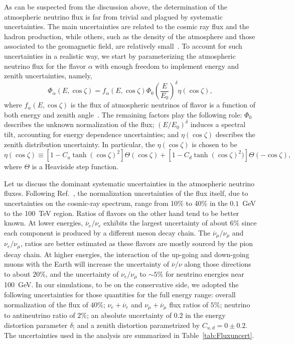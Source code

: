 As can be suspected from the discussion above, the determination of the atmospheric neutrino flux is far from trivial and plagued by systematic uncertainties.
The main uncertainties are related to the cosmic ray flux and the hadron production, while others, such as the density of the atmosphere and those associated to the geomagnetic field, are relatively small~\cite{Barr:2006it}. 
To account for such uncertainties in a realistic way, we start by parameterizing the
atmospheric neutrino flux for the flavor $\alpha$ with enough freedom to implement energy and zenith uncertainties, namely,
%
\begin{equation}
  \Phi_{\alpha}(E,\cos\zeta) =  f_{\alpha}(E,\cos\zeta)\Phi_{0}\left(\frac{E}{E_{0}}\right)^{\delta} \eta(\cos\zeta),
\end{equation}
%
where $f_{\alpha}(E,\cos\zeta)$ is the flux of atmospheric neutrinos of flavor is a function of both energy and zenith angle~\cite{Honda:2015fha}.
The remaining factors play the following role:
$\Phi_{0}$ describes the unknown  normalization of the flux; $(E/E_{0})^{\delta}$ induces a spectral tilt, accounting for energy dependence uncertainties; and $\eta(\cos\zeta)$ describes the zenith distribution uncertainty.
In particular, the $\eta(\cos\zeta)$ is chosen to be
\begin{equation}\label{eq:zenith_uncertainty}
  \eta(\cos\zeta) \equiv \left[1 - C_{u}\tanh(\cos\zeta)^{2}\right]\Theta(\cos\zeta)
  				+\left[1 - C_{d}\tanh(\cos\zeta)^{2})\right]\Theta(-\cos\zeta),
\end{equation}
where $\Theta$ is a Heaviside step function.


Let us discuss the dominant systematic uncertainties in the atmospheric neutrino fluxes. 
Following Ref.~\cite{Barr:2006it}, 
the normalization uncertainties of the flux itself, due to uncertainties on the cosmic-ray spectrum, range from 10\% to 40\% in the $0.1$~GeV to the 100~TeV region.
Ratios of flavors on the other hand tend to be better known.
At lower energies, $\overline{\nu}_{e}/\nu_{e}$ exhibits the
largest uncertainty of about $6\%$ since each component is produced by a
different meson decay chain. 
The $\overline{\nu}_{\mu}/\nu_{\mu}$ and
$\nu_{e}/\nu_{\mu}$, ratios are better estimated as these flavors are mostly sourced by the pion decay chain. 
At higher energies, the interaction of
the up-going and down-going muons with the Earth will increase the
uncertainty of $\overline{\nu}/\nu$ along those directions to about $20\%$, and the uncertainty of $\nu_{e}/\nu_{\mu}$ to $\sim5\%$ for
neutrino energies near 100~GeV. 
In our simulations, to be on the conservative side, we adopted the following uncertainties for those quantities for the full energy range: 
overall normalization of the flux of $40\%$; 
$\nu_{e} + \overline{\nu}_{e}$ and $\nu_{\mu} +
\overline{\nu}_{\mu}$ flux ratios of $5\%$; 
neutrino to antineutrino ratio of $2\%$; 
an absolute uncertainty of $0.2$ in the
energy distortion parameter $\delta$; and a zenith distortion parametrized by $C_{u,d}=0\pm0.2$. The uncertainties used in the analysis are summarized in Table~\ref{tab:Fluxuncert}. 


